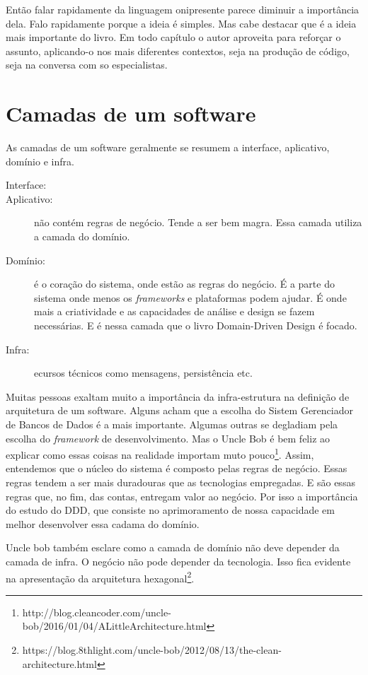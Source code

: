 \documentclass[a4paper, 12pt]{article}
\begin{document}
Então falar rapidamente da linguagem onipresente parece diminuir a importância dela. Falo rapidamente porque a ideia é simples. Mas cabe destacar que é a ideia mais importante do livro. Em todo capítulo o autor aproveita para reforçar o assunto, aplicando-o nos mais diferentes contextos, seja na produção de código, seja na conversa com so especialistas.


\section{Camadas de um software}

As camadas de um software geralmente se resumem a interface, aplicativo, domínio e infra.

\begin{description}
\item [Interface:]
\item [Aplicativo:] não contém regras de negócio. Tende a ser bem magra. Essa camada utiliza a camada do domínio.
\item [Domínio:] é o coração do sistema, onde estão as regras do negócio. É a parte do sistema onde menos os \emph{frameworks} e plataformas podem ajudar. É onde mais a criatividade e as capacidades de análise e design se fazem necessárias. E é nessa camada que o livro Domain-Driven Design é focado.
\item [Infra:] ecursos técnicos como mensagens, persistência etc.
\end{description}

Muitas pessoas exaltam muito a importância da infra-estrutura na definição de arquitetura de um software. Alguns acham que a escolha do Sistem Gerenciador de Bancos de Dados é a mais importante. Algumas outras se degladiam pela escolha do \emph{framework} de desenvolvimento. Mas o Uncle Bob é bem feliz ao explicar como essas coisas na realidade importam muto pouco\footnote{http://blog.cleancoder.com/uncle-bob/2016/01/04/ALittleArchitecture.html}. Assim, entendemos que o núcleo do sistema é composto pelas regras de negócio. Essas regras tendem a ser mais duradouras que as tecnologias empregadas. E são essas regras que, no fim, das contas, entregam valor ao negócio. Por isso a importância do estudo do DDD, que consiste no aprimoramento de nossa capacidade em melhor desenvolver essa cadama do domínio.

Uncle bob também esclare como a camada de domínio não deve depender da camada de infra. O negócio não pode depender da tecnologia. Isso fica evidente na apresentação da arquitetura hexagonal\footnote{https://blog.8thlight.com/uncle-bob/2012/08/13/the-clean-architecture.html}.
\end{document}
